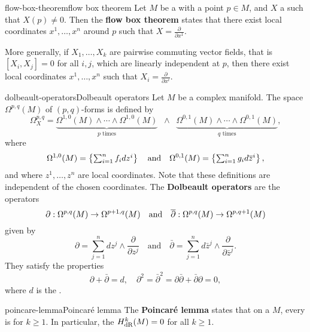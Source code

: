 \begin{topic}{flow-box-theorem}{flow box theorem}
    Let $M$ be a  with a point $p \in M$, and $X$ a  such that $X(p) \ne 0$. Then the \textbf{flow box theorem} states that there exist local coordinates $x^1, \ldots, x^n$ around $p$ such that $X = \frac{\partial}{\partial x^1}$.
    
    More generally, if $X_1, \ldots, X_k$ are pairwise commuting vector fields, that is $[X_i, X_j] = 0$ for all $i, j$, which are linearly independent at $p$, then there exist local coordinates $x^1, \ldots, x^n$ such that $X_i = \frac{\partial}{\partial x^i}$.
\end{topic}

\begin{topic}{dolbeault-operators}{Dolbeault operators}
    Let $M$ be a complex manifold. The space $\Omega^{p, q}(M)$ of $(p, q)$-forms is defined by
    \[ \Omega_X^{p, q} = \underbrace{\Omega^{1,0}(M) \wedge \cdots \wedge \Omega^{1,0}(M)}_{\text{$p$ times}} \;\; \wedge \;\; \underbrace{\Omega^{0,1}(M) \wedge \cdots \wedge \Omega^{0,1}(M)}_{\text{$q$ times}} , \]
    where
    \[ \Omega^{1,0}(M) = \left\{ \textstyle\sum_{i = 1}^{n} f_i dz^i \right\} \quad \textup{and} \quad \Omega^{0,1}(M) = \left\{ \textstyle\sum_{i = 1}^{n} g_i d \overline{z}^i \right\} , \]
    and where $z^1, \ldots, z^n$ are local coordinates. Note that these definitions are independent of the chosen coordinates. The \textbf{Dolbeault operators} are the operators
    \[ \partial : \Omega^{p, q}(M) \to \Omega^{p + 1, q}(M) \quad \textup{and} \quad \overline{\partial} : \Omega^{p, q}(M) \to \Omega^{p, q + 1}(M) \]
    given by
    \[ \partial = \sum_{j = 1}^{n} dz^j \wedge \frac{\partial}{\partial z^j} \quad \text{and} \quad \bar{\partial} = \sum_{j = 1}^{n} d\bar{z}^j \wedge \frac{\partial}{\partial \bar{z}^j} . \]
    They satisfy the properties
    \[ \partial + \bar{\partial} = d, \quad \partial^2 = \bar{\partial}^2 = \partial \bar{\partial} + \bar{\partial} \partial = 0 , \]
    where $d$ is the .
\end{topic}

\begin{topic}{poincare-lemma}{Poincaré lemma}
    The \textbf{Poincaré lemma} states that on a   $M$, every  is  for $k \ge 1$. In particular, the  $H^k_\textup{dR}(M) = 0$ for all $k \ge 1$.
\end{topic}

